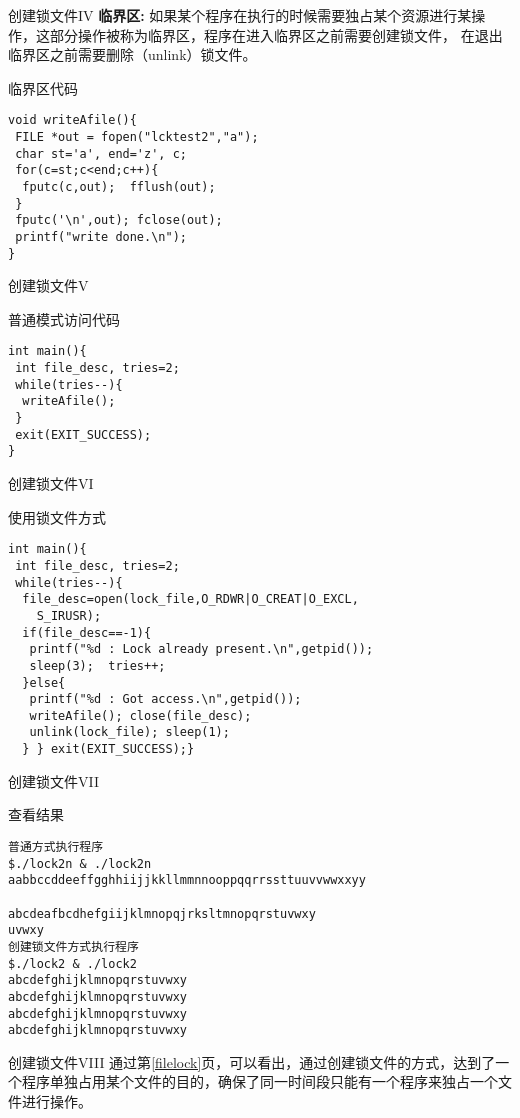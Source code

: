\documentclass{beamer}
\begin{document}
\begin{frame}[fragile]{创建锁文件IV}
\textbf{临界区:}
如果某个程序在执行的时候需要独占某个资源进行某操作，这部分操作被称为临界区，程序在进入临界区之前需要创建锁文件，
在退出临界区之前需要删除（unlink）锁文件。
\begin{block}{临界区代码}
\begin{lstlisting}
void writeAfile(){
 FILE *out = fopen("lcktest2","a");
 char st='a', end='z', c;
 for(c=st;c<end;c++){
  fputc(c,out);  fflush(out);
 }
 fputc('\n',out); fclose(out);
 printf("write done.\n");
}
\end{lstlisting}
\end{block}
\end{frame}
\begin{frame}[fragile]{创建锁文件V}
\begin{block}{普通模式访问代码}
\begin{lstlisting}
int main(){
 int file_desc, tries=2;
 while(tries--){
  writeAfile();
 }
 exit(EXIT_SUCCESS);
}
\end{lstlisting}
\end{block}
\end{frame}
\begin{frame}[fragile]{创建锁文件VI}
\begin{block}{使用锁文件方式}
\begin{lstlisting}
int main(){
 int file_desc, tries=2;
 while(tries--){
  file_desc=open(lock_file,O_RDWR|O_CREAT|O_EXCL,
    S_IRUSR);
  if(file_desc==-1){
   printf("%d : Lock already present.\n",getpid());
   sleep(3);  tries++;
  }else{
   printf("%d : Got access.\n",getpid());
   writeAfile(); close(file_desc);
   unlink(lock_file); sleep(1);
  } } exit(EXIT_SUCCESS);}
\end{lstlisting}
\end{block}
\end{frame}
\begin{frame}[fragile]{创建锁文件VII}
\label{filelock}
\begin{block}{查看结果}
\begin{lstlisting}
普通方式执行程序
$./lock2n & ./lock2n
aabbccddeeffgghhiijjkkllmmnnooppqqrrssttuuvvwwxxyy

abcdeafbcdhefgiijklmnopqjrksltmnopqrstuvwxy
uvwxy
创建锁文件方式执行程序
$./lock2 & ./lock2
abcdefghijklmnopqrstuvwxy
abcdefghijklmnopqrstuvwxy
abcdefghijklmnopqrstuvwxy
abcdefghijklmnopqrstuvwxy
\end{lstlisting}
\end{block}
\end{frame}
\begin{frame}{创建锁文件VIII}
通过第\ref{filelock}页，可以看出，通过创建锁文件的方式，达到了一个程序单独占用某个文件的目的，确保了同一时间段只能有一个程序来独占一个文件进行操作。
\end{frame}
\end{document}
